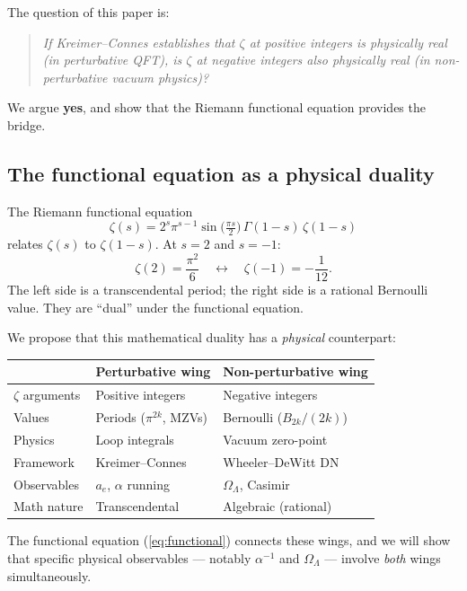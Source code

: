 \documentclass[11pt,a4paper]{article}
\begin{document}
The question of this paper is:
\begin{quote}
\emph{If Kreimer--Connes establishes that $\zeta$ at positive
integers is physically real (in perturbative QFT), is $\zeta$ at
negative integers also physically real (in non-perturbative vacuum
physics)?}
\end{quote}

We argue \textbf{yes}, and show that the Riemann functional equation
provides the bridge.

\subsection{The functional equation as a physical duality}

The Riemann functional equation
\begin{equation}\label{eq:functional}
\zeta(s) = 2^s \pi^{s-1}\sin\!\bigl(\tfrac{\pi s}{2}\bigr)
\,\Gamma(1-s)\,\zeta(1-s)
\end{equation}
relates $\zeta(s)$ to $\zeta(1-s)$. At $s = 2$ and $s = -1$:
\begin{equation}
\zeta(2) = \frac{\pi^2}{6}\quad \longleftrightarrow \quad
\zeta(-1) = -\frac{1}{12}.
\end{equation}
The left side is a transcendental period; the right side is a
rational Bernoulli value. They are ``dual'' under the functional
equation.

We propose that this mathematical duality has a \emph{physical}
counterpart:

\begin{center}
\begin{tabular}{lll}
\toprule
 & \textbf{Perturbative wing} & \textbf{Non-perturbative wing} \\
\midrule
$\zeta$ arguments & Positive integers & Negative integers \\
Values & Periods ($\pi^{2k}$, MZVs) & Bernoulli ($B_{2k}/(2k)$) \\
Physics & Loop integrals & Vacuum zero-point \\
Framework & Kreimer--Connes & Wheeler--DeWitt DN \\
Observables & $a_e$, $\alpha$ running & $\Omega_\Lambda$, Casimir \\
Math nature & Transcendental & Algebraic (rational) \\
\bottomrule
\end{tabular}
\end{center}

The functional equation (\ref{eq:functional}) connects these wings,
and we will show that specific physical observables --- notably
$\alpha^{-1}$ and $\Omega_\Lambda$ --- involve \emph{both} wings
simultaneously.
\end{document}
